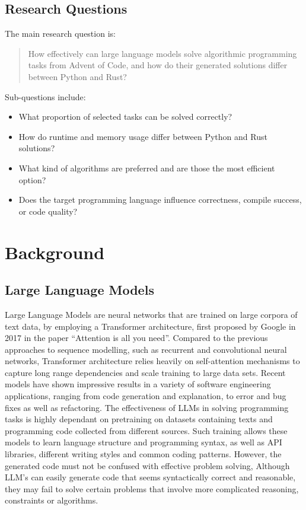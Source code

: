 \documentclass[12pt,a4paper]{report}
\begin{document}
\section{Research Questions}
The main research question is:

\begin{quote}
How effectively can large language models solve algorithmic programming tasks from Advent of Code, and how do their generated solutions differ between Python and Rust?
\end{quote}

Sub-questions include:
\begin{itemize}
    \item What proportion of selected tasks can be solved correctly?
    \item How do runtime and memory usage differ between Python and Rust solutions?
    \item What kind of algorithms are preferred and are those the most efficient option?
    \item Does the target programming language influence correctness, compile success, or code quality?
\end{itemize}




\chapter{Background}

\section{Large Language Models}
Large Language Models are neural networks that are trained on large corpora of text data, by employing a Transformer architecture, first proposed by Google in 2017 in the paper “Attention is all you need”. Compared to the previous approaches to sequence modelling, such as recurrent and convolutional neural networks, Transformer architecture relies heavily on self-attention mechanisms to capture long range dependencies and scale training to large data sets. 
Recent models have shown impressive results in a variety of software engineering applications, ranging from code generation and explanation, to error and bug fixes as well as refactoring. The effectiveness of LLMs in solving programming tasks is highly dependant on pretraining on datasets containing texts and programming code collected from different sources. Such training allows these models to learn language structure and programming syntax, as well as API libraries, different writing styles and common coding patterns. 
However, the generated code must not be confused with effective problem solving, Although LLM’s can easily generate code that seems syntactically correct and reasonable, they may fail to solve certain problems that involve more complicated reasoning, constraints or algorithms. 
\end{document}
